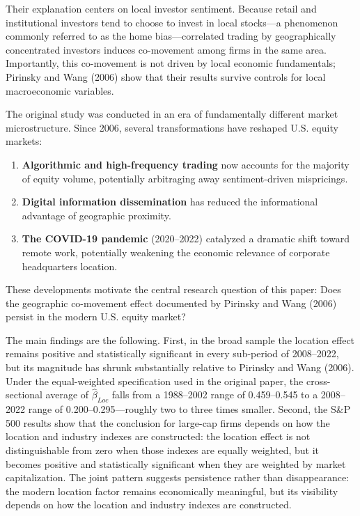 \documentclass[
  12pt,
]{article}
\providecommand{\tightlist}{%
  \setlength{\itemsep}{0pt}\setlength{\parskip}{0pt}}
\begin{document}
Their explanation centers on local investor sentiment. Because retail
and institutional investors tend to choose to invest in local stocks---a
phenomenon commonly referred to as the home bias---correlated trading by
geographically concentrated investors induces co-movement among firms in
the same area. Importantly, this co-movement is not driven by local
economic fundamentals; Pirinsky and Wang (2006) show that their results
survive controls for local macroeconomic variables.

The original study was conducted in an era of fundamentally different
market microstructure. Since 2006, several transformations have reshaped
U.S. equity markets:

\begin{enumerate}
\def\labelenumi{\arabic{enumi}.}
\tightlist
\item
  \textbf{Algorithmic and high-frequency trading} now accounts for the
  majority of equity volume, potentially arbitraging away
  sentiment-driven mispricings.
\item
  \textbf{Digital information dissemination} has reduced the
  informational advantage of geographic proximity.
\item
  \textbf{The COVID-19 pandemic} (2020--2022) catalyzed a dramatic shift
  toward remote work, potentially weakening the economic relevance of
  corporate headquarters location.
\end{enumerate}

These developments motivate the central research question of this paper:
Does the geographic co-movement effect documented by Pirinsky and Wang
(2006) persist in the modern U.S. equity market?

The main findings are the following. First, in the broad sample the
location effect remains positive and statistically significant in every
sub-period of 2008--2022, but its magnitude has shrunk substantially
relative to Pirinsky and Wang (2006). Under the equal-weighted
specification used in the original paper, the cross-sectional average of
\(\hat{\beta}_{Loc}\) falls from a 1988--2002 range of 0.459--0.545 to a
2008--2022 range of 0.200--0.295---roughly two to three times smaller.
Second, the S\&P 500 results show that the conclusion for large-cap
firms depends on how the location and industry indexes are constructed:
the location effect is not distinguishable from zero when those indexes
are equally weighted, but it becomes positive and statistically
significant when they are weighted by market capitalization. The joint
pattern suggests persistence rather than disappearance: the modern
location factor remains economically meaningful, but its visibility
depends on how the location and industry indexes are constructed.
\end{document}
